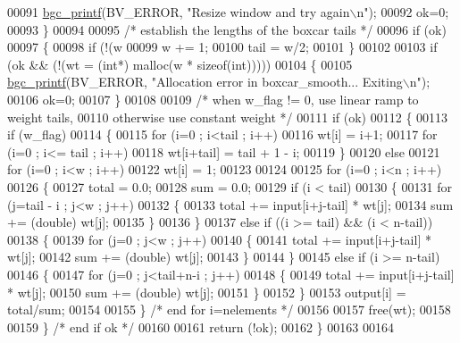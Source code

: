 \begin{DoxyCode}
00091         \hyperlink{bgc__io_8c_af287cce6e2aede1ce337de9319e80d0d}{bgc\_printf}(BV\_ERROR, \textcolor{stringliteral}{"Resize window and try again\(\backslash\)n"});
00092         ok=0;
00093     \}
00094 
00095     \textcolor{comment}{/* establish the lengths of the boxcar tails */}
00096     \textcolor{keywordflow}{if} (ok)
00097     \{
00098         \textcolor{keywordflow}{if} (!(w %
00099             w += 1;
00100         tail = w/2;
00101     \}
00102     
00103     \textcolor{keywordflow}{if} (ok && (!(wt = (\textcolor{keywordtype}{int}*) malloc(w * \textcolor{keyword}{sizeof}(\textcolor{keywordtype}{int})))))
00104     \{
00105         \hyperlink{bgc__io_8c_af287cce6e2aede1ce337de9319e80d0d}{bgc\_printf}(BV\_ERROR, \textcolor{stringliteral}{"Allocation error in boxcar\_smooth... Exiting\(\backslash\)n"});
00106         ok=0;
00107     \}
00108     
00109     \textcolor{comment}{/* when w\_flag != 0, use linear ramp to weight tails, }
00110 \textcolor{comment}{    otherwise use constant weight */}
00111     \textcolor{keywordflow}{if} (ok)
00112     \{
00113         \textcolor{keywordflow}{if} (w\_flag)
00114         \{
00115             \textcolor{keywordflow}{for} (i=0 ; i<tail ; i++)
00116                 wt[i] = i+1;
00117             \textcolor{keywordflow}{for} (i=0 ; i<= tail ; i++)
00118                 wt[i+tail] = tail + 1 - i;
00119         \}
00120         \textcolor{keywordflow}{else}
00121             \textcolor{keywordflow}{for} (i=0 ; i<w ; i++)
00122                 wt[i] = 1;
00123 
00124        
00125         \textcolor{keywordflow}{for} (i=0 ; i<n ; i++)
00126         \{
00127             total = 0.0;
00128             sum = 0.0;
00129             \textcolor{keywordflow}{if} (i < tail)
00130             \{
00131                 \textcolor{keywordflow}{for} (j=tail - i ; j<w ; j++)
00132                 \{
00133                     total += input[i+j-tail] * wt[j];
00134                     sum += (double) wt[j];
00135                 \}
00136             \}
00137             \textcolor{keywordflow}{else} \textcolor{keywordflow}{if} ((i >= tail) && (i < n-tail))
00138             \{
00139                 \textcolor{keywordflow}{for} (j=0 ; j<w ; j++)
00140                 \{
00141                     total += input[i+j-tail] * wt[j];
00142                     sum += (double) wt[j];
00143                 \}
00144             \}
00145             \textcolor{keywordflow}{else} \textcolor{keywordflow}{if} (i >= n-tail)
00146             \{
00147                 \textcolor{keywordflow}{for} (j=0 ; j<tail+n-i ; j++)
00148                 \{
00149                     total += input[i+j-tail] * wt[j];
00150                     sum += (double) wt[j];
00151                 \}
00152             \}
00153             output[i] = total/sum;
00154             
00155         \} \textcolor{comment}{/* end for i=nelements */}
00156         
00157         free(wt);
00158         
00159     \} \textcolor{comment}{/* end if ok */}
00160     
00161     \textcolor{keywordflow}{return} (!ok);
00162 \}   
00163 
00164 
\end{DoxyCode}
